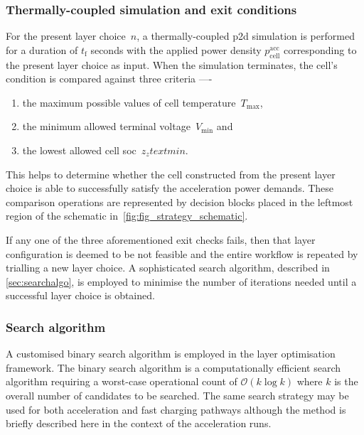 \subsubsection*{Thermally-coupled  simulation and exit
conditions}\label{sec:accexitconditions}

For the  present layer choice~$n$,  a thermally-coupled \gls{p2d}  simulation is
performed for a duration of $t_\text{f}$  seconds with the applied power density
$p^\text{acc}_\text{cell}$ corresponding to the present layer choice as input.
When the simulation terminates, the cell's condition is compared against three
criteria ----
\begin{enumerate}
    \item the maximum possible values of cell temperature~$T_\text{max}$,
    \item the minimum allowed terminal voltage~$V_\text{min}$ and
    \item the lowest allowed cell \gls{soc}~$z_ztext{min}$.
\end{enumerate}
This helps to determine whether the cell constructed from the present layer
choice is able to successfully satisfy the acceleration power demands. These
comparison operations are represented by decision blocks placed in the leftmost
region of the schematic in~\cref{fig:fig_strategy_schematic}.

If  any one  of the  three  aforementioned exit  checks fails,  then that  layer
configuration is deemed  to be not feasible and the  entire workflow is repeated
by trialling a new layer choice.  A sophisticated search algorithm, described in
\cref{sec:searchalgo}, is employed  to minimise the number  of iterations needed
until a successful layer choice is obtained.

\subsubsection*{Search algorithm}\label{sec:searchalgo}

A  customised binary  search algorithm  is  employed in  the layer  optimisation
framework. The  binary search  algorithm is  a computationally  efficient search
algorithm requiring  a worst-case operational  count of $\mathcal{O}(k  \log k)$
where $k$ is  the overall number of  candidates to be searched.  The same search
strategy may be  used for both acceleration and fast  charging pathways although
the method is briefly described here in the context of the acceleration runs.

